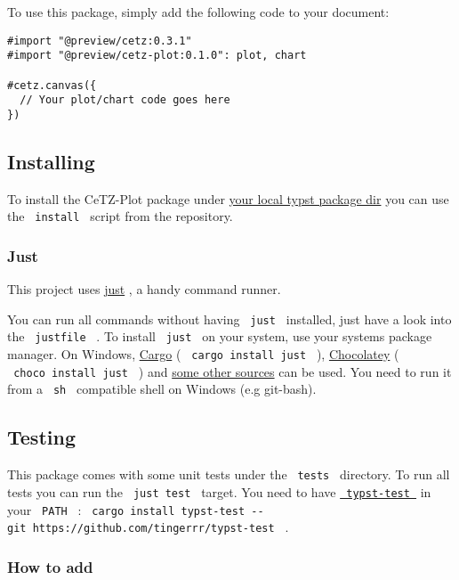 To use this package, simply add the following code to your document:

\begin{verbatim}
#import "@preview/cetz:0.3.1"
#import "@preview/cetz-plot:0.1.0": plot, chart

#cetz.canvas({
  // Your plot/chart code goes here
})
\end{verbatim}

\subsection{Installing}\label{installing}

To install the CeTZ-Plot package under
\href{https://github.com/typst/packages?tab=readme-ov-file\#local-packages}{your
local typst package dir} you can use the \texttt{\ install\ } script
from the repository.

\subsubsection{Just}\label{just}

This project uses \href{https://github.com/casey/just}{just} , a handy
command runner.

You can run all commands without having \texttt{\ just\ } installed,
just have a look into the \texttt{\ justfile\ } . To install
\texttt{\ just\ } on your system, use your systems package manager. On
Windows, \href{https://doc.rust-lang.org/cargo/}{Cargo} (
\texttt{\ cargo\ install\ just\ } ),
\href{https://chocolatey.org/}{Chocolatey} (
\texttt{\ choco\ install\ just\ } ) and
\href{https://just.systems/man/en/chapter_4.html}{some other sources}
can be used. You need to run it from a \texttt{\ sh\ } compatible shell
on Windows (e.g git-bash).

\subsection{Testing}\label{testing}

This package comes with some unit tests under the \texttt{\ tests\ }
directory. To run all tests you can run the \texttt{\ just\ test\ }
target. You need to have
\href{https://github.com/tingerrr/typst-test/}{\texttt{\ typst-test\ }}
in your \texttt{\ PATH\ } :
\texttt{\ cargo\ install\ typst-test\ -\/-git\ https://github.com/tingerrr/typst-test\ }
.

\subsubsection{How to add}\label{how-to-add}

